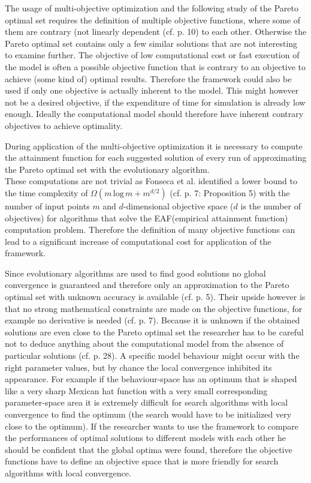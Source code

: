 \documentclass[12pt,twoside]{article}
\theoremstyle{plain}
\theoremstyle{definition}
\theoremstyle{remark}
\begin{document}
The usage of multi-objective optimization and the following study of the Pareto optimal set requires the definition of multiple objective functions, where some of them are contrary (not linearly dependent (cf. \cite{doncieux2015multi} p. 10) to each other. Otherwise the Pareto optimal set contains only a few similar solutions that are not interesting to examine further. The objective of low computational cost or fast execution of the model is often a possible objective function that is contrary to an objective to achieve (some kind of) optimal results. Therefore the framework could also be used if only one objective is actually inherent to the model. This might however not be a desired objective, if the expenditure of time for simulation is already low enough. Ideally the computational model should therefore have inherent contrary objectives to achieve optimality.\medskip

During application of the multi-objective optimization it is necessary to compute the attainment function for each suggested solution of every run of approximating the Pareto optimal set with the evolutionary algorithm.\\
These computations are not trivial as Fonseca et al. identified a lower bound to the time complexity of $\Omega(m\,\mbox{log}\,m+m^{d/2})$ (cf. \cite{fonseca2011computation} p. 7: Proposition 5) with the number of input points $m$ and $d$-dimensional objective space ($d$ is the number of objectives) for algorithms that solve the EAF(empirical attainment function) computation problem.
Therefore the definition of many objective functions can lead to a significant increase of computational cost for application of the framework.\medskip

Since evolutionary algorithms are used to find good solutions no global convergence is guaranteed and therefore only an approximation to the Pareto optimal set with unknown accuracy is available (cf. \cite{doncieux2015multi} p. 5). Their upside however is that no strong mathematical constraints are made on the objective functions, for example no derivative is needed (cf. \cite{doncieux2015multi} p. 7).
Because it is unknown if the obtained solutions are even close to the Pareto optimal set the researcher has to be careful not to deduce anything about the computational model from the absence of particular solutions (cf. \cite{doncieux2015multi} p. 28).
A specific model behaviour might occur with the right parameter values, but by chance the local convergence inhibited its appearance.
For example if the behaviour-space has an optimum that is shaped like a very sharp Mexican hat function with a very small corresponding parameter-space area it is extremely difficult for search algorithms with local convergence to find the optimum (the search would have to be initialized very close to the optimum).
If the researcher wants to use the framework to compare the performances of optimal solutions to different models with each other he should be confident that the global optima were found, therefore the objective functions have to define an objective space that is more friendly for search algorithms with local convergence.\medskip
\end{document}
